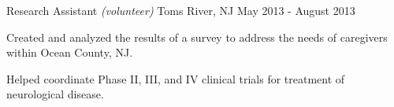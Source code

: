 \begin{cventries}
    {Research Assistant \textnormal{\small{\textit{(volunteer)}}}}
    {Toms River, NJ}
    {May 2013 - August 2013}
    {\begin{cvitems}
        \item{Created and analyzed the results of a 
            {survey} to address the needs of caregivers within Ocean County,
            NJ.\vspace*{0.1cm}}
        \item{Helped coordinate Phase II, III, and IV clinical trials for treatment of
            neurological disease.}
    \end{cvitems}}
    \vspace*{0.2cm}
    
\vspace*{-0.2cm}
\end{cventries}
